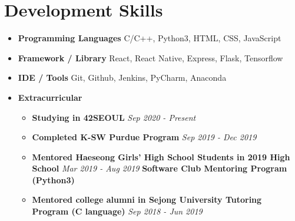 \documentclass[letterpaper,11pt]{article}
\newcommand{\resumeItem}[2]{
  \item\small{
    \textbf{#1}{ #2 \vspace{-2pt}}
  }
}
\newcommand{\resumeSubHeadingListStart}{\begin{itemize}[leftmargin=*]}
\newcommand{\resumeSubHeadingListEnd}{\end{itemize}}
\newcommand{\resumeItemSubListStart}{\begin{itemize}}
\newcommand{\resumeItemSubListStart}{\begin{itemize}}
\newcommand{\resumeItemSubListEnd}{\end{itemize}\vspace{-5pt}}
\begin{document}
  
\section{Development Skills}
 \resumeSubHeadingListStart
  \resumeItem{Programming Languages}{C/C++, Python3, HTML, CSS, JavaScript}
  \resumeItem{Framework / Library}{React, React Native, Express, Flask, Tensorflow}
  \resumeItem{IDE / Tools}{Git, Github, Jenkins, PyCharm, Anaconda}
  \resumeItem{Extracurricular}{}
    \resumeItemSubListStart
      \resumeItem {Studying in 42SEOUL   }{   }{   }{   }{   }{   }{   }{   }{   }{   }{   }{   }{   }{   }{   }{   }{   }{   }{   }{   }{   }{   }{   }{   }{   }{   }{   }{   }{   }{   }{   }{   }{   }{   }{   }{   }{   }{   }{   }{   }{   }{   }{   }{   }{   }{   }{   }{   }{   }{   }{   }{   }{   }{   }{   }{   }{   }{   }{   }{   }{   }{   }{   }{   }{   }{   }{   }{   }{   }{   }{   }{   }{   }{   }{   }{   }{   }{   }{   }{   }{   }{   }{   }{   }{   }{   }{   }{   }{   }{  }{  }{  }{  }{  }{\emph{Sep 2020 - Present}}
      \resumeItem {Completed K-SW Purdue Program }{    }{   }{   }{   }{   }{   }{   }{   }{   }{   }{   }{   }{   }{   }{   }{   }{   }{   }{   }{   }{   }{   }{   }{   }{   }{   }{   }{   }{   }{   }{   }{   }{   }{   }{   }{   }{   }{   }{   }{   }{   }{   }{   }{   }{   }{   }{   }{   }{   }{   }{   }{   }{   }{   }{   }{   }{   }{   }{   }{   }{   }{   }{   }{   }{   }{   }{   }{   }{   }{   }{   }{  }{  }{  }{  }{  }{\emph{Sep 2019 - Dec 2019}}
      \resumeItem {Mentored Haeseong Girls' High School Students in 2019 High School }{   }{   }{   }{   }{   }{   }{   }{   }{   }{   }{  }{  }{  }{  }{  }{\emph{Mar 2019 - Aug 2019}}
      \textbf{Software Club Mentoring Program (Python3)}
      \resumeItem {Mentored college alumni in Sejong University Tutoring Program (C language) }{  }{  }{  }{\emph{Sep 2018 - Jun 2019}}
    \resumeItemSubListEnd
 \resumeSubHeadingListEnd


\end{document}
